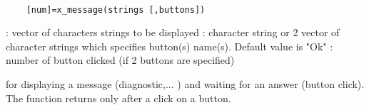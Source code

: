 \begin{mandesc}
  \\ %
\end{mandesc}
\label{x-message}
\begin{calling_sequence}
  \begin{verbatim}
    [num]=x_message(strings [,buttons])   
  \end{verbatim}
\end{calling_sequence}
\begin{parameters}
  \begin{varlist}
     : vector of characters strings to be displayed
     : character string or 2 vector of character strings which specifies button(s) name(s). Default value is "Ok"
     : number  of button clicked (if 2 buttons are specified)
  \end{varlist}
\end{parameters}
\begin{mandescription}
  for displaying a message (diagnostic,... ) and waiting for
  an answer (button click). The function returns only after a click on a
  button.
\end{mandescription}
\begin{examples}
  \begin{program}
  \end{program}
\end{examples}
\begin{manseealso}
      
\end{manseealso}

